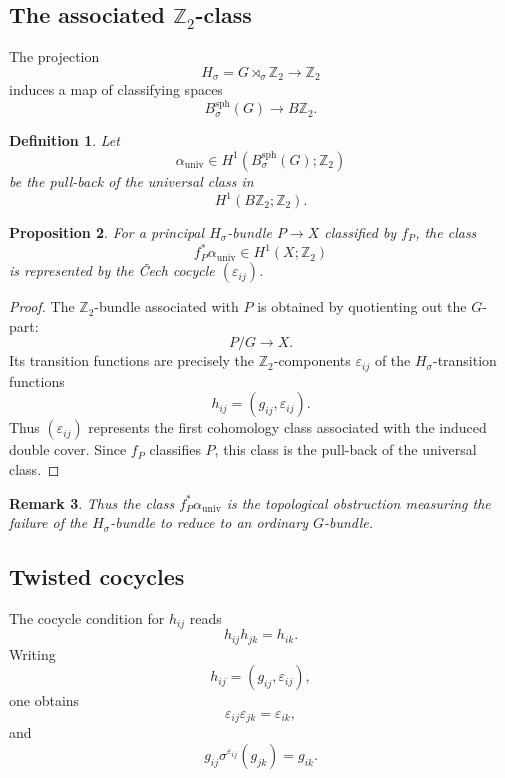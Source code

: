 \documentclass[11pt]{amsart}
\newtheorem{definition}{Definition}[section]
\newtheorem{proposition}[definition]{Proposition}
\newtheorem{remark}[definition]{Remark}
\begin{document}
\subsection{The associated \texorpdfstring{\(\mathbb Z_2\)}{Z2}-class}

The projection
\[
H_\sigma=G\rtimes_\sigma\mathbb Z_2
\longrightarrow
\mathbb Z_2
\]
induces a map of classifying spaces
\[
B^{\mathrm{sph}}_\sigma(G)
\longrightarrow
B\mathbb Z_2.
\]

\begin{definition}
Let
\[
\alpha_{\mathrm{univ}}\in H^1(B^{\mathrm{sph}}_\sigma(G);\mathbb Z_2)
\]
be the pull-back of the universal class in
\[
H^1(B\mathbb Z_2;\mathbb Z_2).
\]
\end{definition}

\begin{proposition}
For a principal \(H_\sigma\)-bundle \(P\to X\) classified by \(f_P\), the class
\[
f_P^*\alpha_{\mathrm{univ}}\in H^1(X;\mathbb Z_2)
\]
is represented by the Čech cocycle \((\varepsilon_{ij})\).
\end{proposition}

\begin{proof}
The \(\mathbb Z_2\)-bundle associated with \(P\) is obtained by quotienting out the \(G\)-part:
\[
P/G\longrightarrow X.
\]
Its transition functions are precisely the \(\mathbb Z_2\)-components \(\varepsilon_{ij}\) of the \(H_\sigma\)-transition functions
\[
h_{ij}=(g_{ij},\varepsilon_{ij}).
\]
Thus \((\varepsilon_{ij})\) represents the first cohomology class associated with the induced double cover. Since \(f_P\) classifies \(P\), this class is the pull-back of the universal class.
\end{proof}

\begin{remark}
Thus the class \(f_P^*\alpha_{\mathrm{univ}}\) is the topological obstruction measuring the failure of the \(H_\sigma\)-bundle to reduce to an ordinary \(G\)-bundle.
\end{remark}

\subsection{Twisted cocycles}

The cocycle condition for \(h_{ij}\) reads
\[
h_{ij}h_{jk}=h_{ik}.
\]
Writing
\[
h_{ij}=(g_{ij},\varepsilon_{ij}),
\]
one obtains
\[
\varepsilon_{ij}\varepsilon_{jk}=\varepsilon_{ik},
\]
and
\[
g_{ij}\sigma^{\varepsilon_{ij}}(g_{jk})=g_{ik}.
\]
\end{document}

